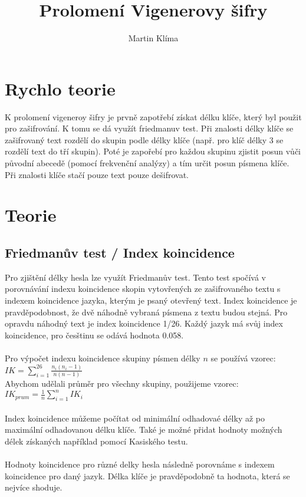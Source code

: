 \documentclass{article}
\title{Prolomení Vigenerovy šifry}
\author{Martin Klíma}
\begin{document}
\maketitle

\section{Rychlo teorie}
K prolomení vigeneroy šifry je prvně zapotřebí získat délku klíče, 
který byl použit pro zašifrování. K tomu se dá využít friedmanuv test. 
Při znalosti délky klíče se zašifrovaný text rozdělí do skupin podle 
délky klíče (např. pro klíč délky 3 se rozdělí text do tří skupin). 
Poté je zapořebí pro každou skupinu zjistit posun vůči původní abecedě 
(pomocí frekvenční analýzy) a tím určit posun písmena klíče. Při znalosti 
klíče stačí pouze text pouze dešifrovat.

\section{Teorie}
\subsection{Friedmanův test / Index koincidence}
Pro zjištění délky hesla lze využít Friedmanův test. Tento test spočívá 
v porovnávání indexu koincidence skopin vytovřených ze zašifrovaného 
textu s indexem koincidence jazyka, kterým je psaný otevřený text. Index 
koincidence je pravděpodobnost, že dvě náhodně vybraná písmena z textu 
budou stejná. Pro opravdu náhodný text je index koincidence 1/26. Každý 
jazyk má svůj index koincidence, pro česštinu se odává hodnota 0.058. 
\\\\
Pro výpočet indexu koincidence skupiny písmen délky $n$ se používá vzorec: 
$IK = \sum \limits_{i=1}^{26} \frac{n_i (n_i - 1)}{n (n - 1)}$\\
Abychom udělali průměr pro všechny skupiny, použijeme vzorec:
$IK_{prum} = \frac{1}{n} \sum \limits_{i=1}^{n} IK_i$\\
\\
Index koincidence můžeme počítat od minimální odhadovaé délky až po 
maximální odhadovanou délku klíče. Také je možné přidat hodnoty možných 
délek získaných například pomocí Kasiského testu.\\
\\
Hodnoty koincidence pro různé delky hesla následně porovnáme s indexem
koincidence pro daný jazyk. Délka klíče je pravděpodobně ta hodnota, která 
se nejvíce shoduje.
\end{document}
